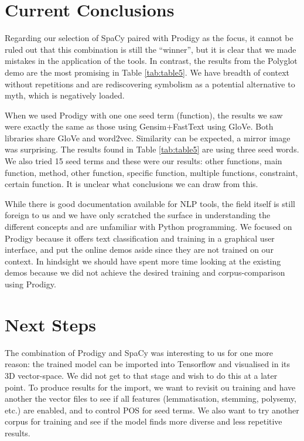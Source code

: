\documentclass[12pt, usenames, dvipsnames]{report}
\begin{document}
\begin{flushleft}

\section{Current Conclusions}

Regarding our selection of SpaCy paired with Prodigy as the focus, it cannot be ruled out that this combination is still the “winner”, but it is clear that we made mistakes in the application of the tools.
In contrast, the results from the Polyglot demo are the most promising in Table \ref{tab:table5}. 
We have breadth of context without repetitions and are rediscovering symbolism as a potential alternative to myth, which is negatively loaded.

When we used Prodigy with one one seed term (function), the results we saw were exactly the same as those using Gensim+FastText using GloVe.
Both libraries share GloVe and word2vec. Similarity can be expected, a mirror image was surprising.
The results found in Table \ref{tab:table5} are using three seed words.
We also tried 15 seed terms and these were our results: other functions, main function, method, other function, specific function, multiple functions, constraint, certain function.
It is unclear what conclusions we can draw from this.

While there is good documentation available for NLP tools, the field itself is still foreign to us and we have only scratched the surface in understanding the different concepts and are unfamiliar with Python programming.
We focused on Prodigy because it offers text classification and training in a graphical user interface, and put the online demos aside since they are not trained on our context.
In hindsight we should have spent more time looking at the existing demos because we did not achieve the desired training and corpus-comparison using Prodigy.


\section{Next Steps}

The combination of Prodigy and SpaCy was interesting to us for one more reason: the trained model can be imported into Tensorflow and visualised in its 3D vector-space.
We did not get to that stage and wish to do this at a later point.
To produce results for the import, we want to revisit ou training and have another the vector files to see if all features (lemmatisation, stemming, polysemy, etc.) are enabled, and to control POS for seed terms.
We also want to try another corpus for training and see if the model finds more diverse and less repetitive results.


\end{flushleft}
\end{document}
